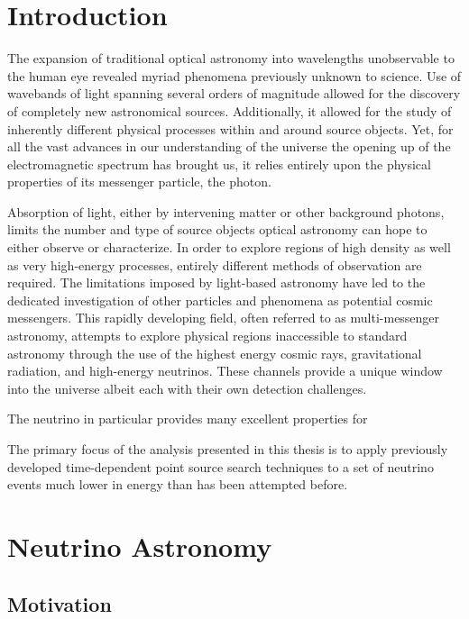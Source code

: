 \documentclass{gatech-thesis}
\begin{document}
\chapter{Introduction}

The expansion of traditional optical astronomy into wavelengths unobservable to the human eye revealed myriad phenomena previously unknown to science. Use of wavebands of light spanning several orders of magnitude allowed for the discovery of completely new astronomical sources. Additionally, it allowed for the study of inherently different physical processes within and around source objects. Yet, for all the vast advances in our understanding of the universe the opening up of the electromagnetic spectrum has brought us, it relies entirely upon the physical properties of its messenger particle, the photon.

Absorption of light, either by intervening matter or other background photons, limits the number and type of source objects optical astronomy can hope to either observe or characterize. In order to explore regions of high density as well as very high-energy processes, entirely different methods of observation are required. The limitations imposed by light-based astronomy have led to the dedicated investigation of other particles and phenomena as potential cosmic messengers. This rapidly developing field, often referred to as multi-messenger astronomy, attempts to explore physical regions inaccessible to standard astronomy through the use of the highest energy cosmic rays, gravitational radiation, and high-energy neutrinos. These channels provide a unique window into the universe albeit each with their own detection challenges.

The neutrino in particular provides many excellent properties for




The primary focus of the analysis presented in this thesis is to apply previously developed time-dependent point source search techniques to a set of neutrino events much lower in energy than has been attempted before.

\chapter{Neutrino Astronomy}

\section{Motivation}
\end{document}
